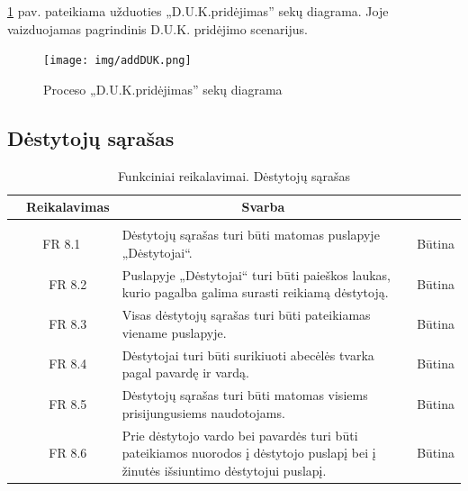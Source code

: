 \documentclass{VUMIFPSkursinis}
\begin{document}
\ref{fig:addduk} pav. pateikiama užduoties „D.U.K.pridėjimas” sekų diagrama. Joje vaizduojamas pagrindinis
D.U.K. pridėjimo scenarijus.
\begin{figure}[H]
	\centering
	\texttt{[image: img/addDUK.png]}
	\caption{Proceso „D.U.K.pridėjimas” sekų diagrama}
	\label{fig:addduk}
\end{figure}

\subsection{Dėstytojų sąrašas}

	\begin{table}[H]
	\caption{Funkciniai reikalavimai. Dėstytojų sąrašas}
	\begin{tabular}{|p{1cm}|p{1cm}|p{}|p{}|}
		\hline 
		\rowcolor{gray!50}
		\multicolumn{2}{|c|}{{\bfseries Kodas}}&
		\multicolumn{1}{c|}{{\bfseries Reikalavimas}}&
		\multicolumn{1}{c|}{{\bfseries Svarba}}\\
		\hline
		\rowcolor{lightgray}
		\multicolumn{4}{|c|}{Dėstytojų sąrašas}\\		
		
		\hline
		\multicolumn{2}{|c|}{FR 8.1}&
		{Dėstytojų sąrašas turi būti matomas puslapyje „Dėstytojai“.
		}&		
		\multicolumn{1}{c|}{Būtina}\\
		\hline
		\multicolumn{1}{|c}{}&
		\multicolumn{1}{c|}{FR 8.2}&
		{Puslapyje „Dėstytojai“ turi būti paieškos laukas, kurio pagalba galima surasti reikiamą dėstytoją.
		}&		
		\multicolumn{1}{c|}{Būtina}\\
		\hline
		\multicolumn{1}{|c}{}&
		\multicolumn{1}{c|}{FR 8.3}&
		{Visas dėstytojų sąrašas turi būti pateikiamas viename puslapyje.
		}&
		\multicolumn{1}{c|}{Būtina}\\	
		\hline		
		\multicolumn{1}{|c}{}&
		\multicolumn{1}{c|}{FR 8.4}&
		{Dėstytojai turi būti surikiuoti abecėlės tvarka pagal pavardę ir vardą.
		}&
		\multicolumn{1}{c|}{Būtina}\\									
		\hline
		\multicolumn{1}{|c}{}&
		\multicolumn{1}{c|}{FR 8.5}&
		{Dėstytojų sąrašas turi būti matomas visiems prisijungusiems naudotojams.
		}&
		\multicolumn{1}{c|}{Būtina}\\	
		\hline	
		\multicolumn{1}{|c}{}&
		\multicolumn{1}{c|}{FR 8.6}&
		{Prie dėstytojo vardo bei pavardės turi būti pateikiamos nuorodos į dėstytojo puslapį bei į žinutės išsiuntimo dėstytojui puslapį.
		}&
		\multicolumn{1}{c|}{Būtina}\\	
		\hline		
	\end{tabular}		
\end{table}
\end{document}
